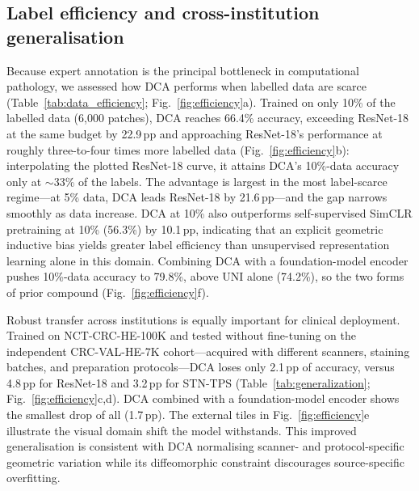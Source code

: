 \documentclass[pdflatex,sn-nature]{sn-jnl}%
\theoremstyle{thmstyleone}%
\theoremstyle{thmstyletwo}%
\theoremstyle{thmstylethree}%
\begin{document}
\subsection{Label efficiency and cross-institution generalisation}

Because expert annotation is the principal bottleneck in computational pathology,
we assessed how DCA performs when labelled data are scarce
(Table~\ref{tab:data_efficiency}; Fig.~\ref{fig:efficiency}a). Trained on only
10\% of the labelled data (6{,}000 patches), DCA reaches 66.4\% accuracy,
exceeding ResNet-18 at the same budget by 22.9\,pp and approaching ResNet-18's
performance at roughly three-to-four times more labelled data
(Fig.~\ref{fig:efficiency}b): interpolating the plotted ResNet-18 curve, it
attains DCA's 10\%-data accuracy only at $\sim$33\% of the labels. The advantage
is largest in the most label-scarce regime---at 5\% data, DCA leads ResNet-18 by
21.6\,pp---and the gap narrows smoothly as data increase. DCA at 10\% also
outperforms self-supervised SimCLR pretraining at 10\% (56.3\%) by 10.1\,pp,
indicating that an explicit geometric inductive bias yields greater label
efficiency than unsupervised representation learning alone in this domain.
Combining DCA with a foundation-model encoder pushes 10\%-data accuracy to 79.8\%,
above UNI alone (74.2\%), so the two forms of prior compound
(Fig.~\ref{fig:efficiency}f).

Robust transfer across institutions is equally important for clinical
deployment. Trained on NCT-CRC-HE-100K and tested without fine-tuning on the
independent CRC-VAL-HE-7K cohort---acquired with different scanners, staining
batches, and preparation protocols---DCA loses only 2.1\,pp of accuracy, versus
4.8\,pp for ResNet-18 and 3.2\,pp for STN-TPS (Table~\ref{tab:generalization};
Fig.~\ref{fig:efficiency}c,d). DCA combined with a foundation-model encoder shows
the smallest drop of all (1.7\,pp). The external tiles in
Fig.~\ref{fig:efficiency}e illustrate the visual domain shift the model
withstands. This improved generalisation is consistent with DCA normalising
scanner- and protocol-specific geometric variation while its diffeomorphic
constraint discourages source-specific overfitting.
\end{document}
